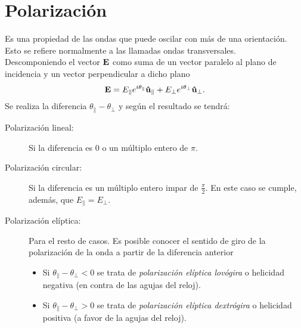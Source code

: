 \section{Polarización}
Es una propiedad de las ondas que puede oscilar con más de una orientación. Esto se refiere normalmente a las llamadas ondas transversales. \\
Descomponiendo el vector $\vb{E}$ como suma de un vector paralelo al plano de incidencia y un vector perpendicular a dicho plano
\begin{equation}
	\vb{E} = E_\parallel e^{i\theta_\parallel} \vu{u} _\parallel + E_\perp e^{i\theta_\perp} \vu{u}_\perp.
\end{equation}
Se realiza la diferencia $\theta _\parallel - \theta _\perp$ y según el resultado se tendrá:
\begin{description}
	\item[Polarización lineal: ] Si la diferencia es $0$ o un múltiplo entero de $\pi$.
	\item[Polarización circular: ] Si la diferencia es un múltiplo entero impar de $\frac{\pi}{2}$. En este caso se cumple, además, que $E_\parallel = E_\perp$.
	\item[Polarización elíptica: ] Para el resto de casos. Es posible conocer el sentido de giro de la polarización de la onda a partir de la diferencia anterior 
	\begin{itemize}
		\item Si $\theta _\parallel - \theta _\perp < 0$ se trata de \textit{polarización elíptica lovógira} o helicidad negativa (en contra de las agujas del reloj).
		\item Si $\theta _\parallel - \theta _\perp > 0$ se trata de \textit{polarización elíptica dextrógira} o helicidad positiva (a favor de la agujas del reloj).
	\end{itemize}
\end{description}










































